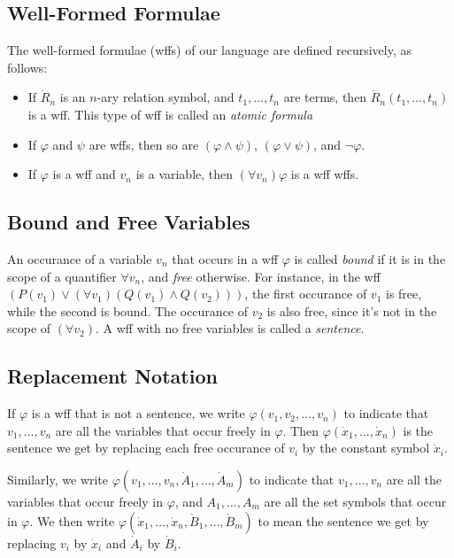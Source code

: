 \documentclass{article}
\begin{document}
\subsection{Well-Formed Formulae}
The well-formed formulae (wffs) of our language are defined recursively, as follows:
\begin{itemize}
    \item If $\dot R_n$ is an $n$-ary relation symbol, and $t_1, \ldots, t_n$ are terms, then $\dot R_n(t_1, \ldots, t_n)$ is a wff. This type of wff is called an \textit{atomic formula}
    \item If $\varphi$ and $\psi$ are wffs, then so are $(\varphi \land \psi)$, $(\varphi \lor \psi)$, and $\neg \varphi$. 
    \item If $\varphi$ is a wff and $v_n$ is a variable, then $(\forall v_n) \varphi$ is a wff wffs.
\end{itemize}

\subsection{Bound and Free Variables}
An occurance of a variable $v_n$ that occurs in a wff $\varphi$ is called \textit{bound} if it is in the scope of a quantifier $\forall v_n$, and \textit{free} otherwise. For instance, in the wff $(P(v_1) \lor (\forall v_1) (Q(v_1) \land Q(v_2)))$, the first occurance of $v_1$ is free, while the second is bound. The occurance of $v_2$ is also free, since it's not in the scope of $(\forall v_2)$. A wff with no free variables is called a \textit{sentence}.

\subsection{Replacement Notation}
If $\varphi$ is a wff that is not a sentence, we write $\varphi(v_1, v_2, \ldots, v_n)$ to indicate that $v_1, \ldots, v_n$ are all the variables that occur freely in $\varphi$. Then $\varphi(\dot x_1, \ldots, \dot x_n)$ is the sentence we get by replacing each free occurance of $v_i$ by the constant symbol $\dot x_i$. 

Similarly, we write $\varphi(v_1, \ldots, v_n, \dot A_1, \ldots, \dot A_m)$ to indicate that $v_1, \ldots, v_n$ are all the variables that occur freely in $\varphi$, and $A_1, \ldots, A_m$ are all the set symbols that occur in $\varphi$. We then write $\varphi(\dot x_1, \ldots, \dot x_n, \dot B_1, \ldots, \dot B_m)$ to mean the sentence we get by replacing $v_i$ by $\dot x_i$ and $\dot A_i$ by $\dot B_i$.
\end{document}
